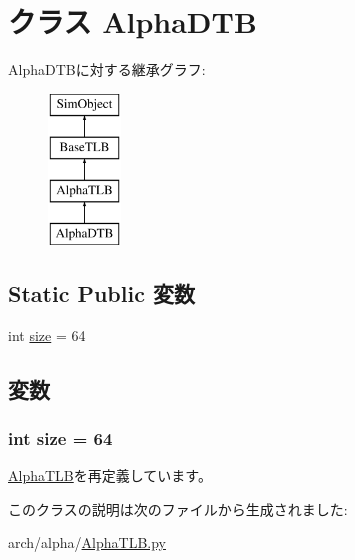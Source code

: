 \hypertarget{classAlphaTLB_1_1AlphaDTB}{
\section{クラス AlphaDTB}
\label{classAlphaTLB_1_1AlphaDTB}
}
AlphaDTBに対する継承グラフ:\begin{figure}[H]
\begin{center}
\leavevmode
\includegraphics[height=4cm]{classAlphaTLB_1_1AlphaDTB}
\end{center}
\end{figure}
\subsection*{Static Public 変数}
\begin{DoxyCompactItemize}
\item 
int \hyperlink{classAlphaTLB_1_1AlphaDTB_a439227feff9d7f55384e8780cfc2eb82}{size} = 64
\end{DoxyCompactItemize}


\subsection{変数}
\hypertarget{classAlphaTLB_1_1AlphaDTB_a439227feff9d7f55384e8780cfc2eb82}{
\subsubsection[{size}]{\setlength{\rightskip}{0pt plus 5cm}int {\bf size} = 64}}
\label{classAlphaTLB_1_1AlphaDTB_a439227feff9d7f55384e8780cfc2eb82}


\hyperlink{classAlphaTLB_1_1AlphaTLB_a377e5da8df1f89c5468c8b8cd07eac89}{AlphaTLB}を再定義しています。

このクラスの説明は次のファイルから生成されました:\begin{DoxyCompactItemize}
\item 
arch/alpha/\hyperlink{AlphaTLB_8py}{AlphaTLB.py}\end{DoxyCompactItemize}
